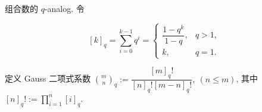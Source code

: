 组合数的 \(q\)-analog. 令

\[
    [k]_q=\sum_{i=0}^{k-1}q^i=\begin{cases}
        \dfrac{1-q^k}{1-q}, & q>1, \\
        k,                  & q=1.
    \end{cases}
\]

定义 Gauss 二项式系数 \(\binom{m}{n}_q:=\dfrac{[m]_q!}{[n]_q![m-n]_q!},~(n\leq m)\), 其中 \([n]_q!:=\prod_{i=1}^n [i]_q\).